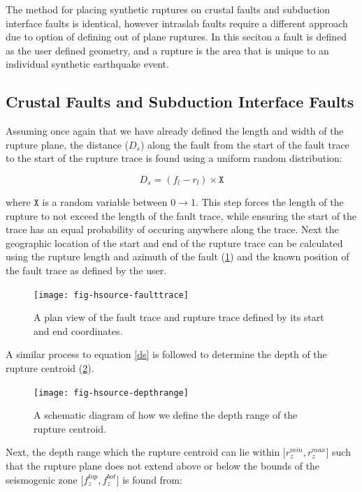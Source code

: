 The method for placing synthetic ruptures on crustal faults and subduction interface faults is identical, however intraslab faults require a 
different approach due to option of defining out of plane ruptures. In this seciton a fault is defined as the user defined geometry, and
a rupture is the area that is unique to an individual synthetic earthquake event. \\

\subsection{Crustal Faults and Subduction Interface Faults}
Assuming once again that we have already defined the length and width of the rupture plane, the distance ($D_s$) along the fault from the start of the fault trace to
the start of the rupture trace is found using a uniform random distribution:

\begin{equation} \label{eq:ds}
D_s = (f_l - r_l) \times \mathtt{X}
\end{equation}

where $\mathtt{X}$ is a random variable between 0$\rightarrow$1. This step forces the length of the rupture to not exceed the length of the fault trace, while 
ensuring the start of the trace has an equal probability of occuring anywhere along the trace. Next the geographic location of the start and end of the rupture trace can be 
calculated using the rupture length and azimuth of the fault (\ref{fig:traces}) and the known position of the fault trace as defined by the user. 

\begin{figure}[htp]
\centerline{\texttt{[image: fig-hsource-faulttrace]}}
\caption{A plan view of the fault trace and rupture trace defined by its start and end coordinates.}
\label{fig:traces}
\end{figure}

A similar process to equation \ref{ds} is followed to determine the depth of the rupture centroid (\ref{fig:rzrange}). 

\begin{figure}[htp]
\centerline{\texttt{[image: fig-hsource-depthrange]}}
\caption{A schematic diagram of how we define the depth range of the rupture centroid.}
\label{fig:rzrange}
\end{figure}

Next, the depth range which the rupture centroid can lie within [$r_z^{min}, r_z^{max}$] such that 
the rupture plane does not extend above or below the bounds of the seismogenic zone [$f_z^{top}, f_z^{bot}$] is found from:

